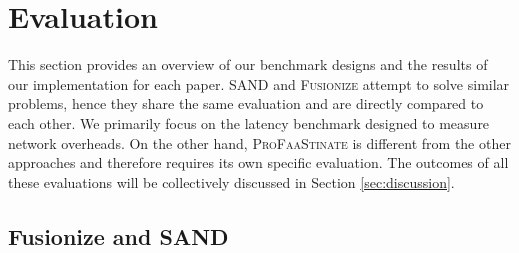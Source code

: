 \section{Evaluation}\label{sec:evaluation}


This section provides an overview of our benchmark designs and the results of
our implementation for each paper. SAND and \textsc{Fusionize} attempt to solve
similar problems, hence they share the same evaluation and are directly compared
to each other. We primarily focus on the latency benchmark designed to measure
network overheads. On the other hand, \textsc{ProFaaStinate} is different from
the other approaches and therefore requires its own specific evaluation. The
outcomes of all these evaluations will be collectively discussed in Section
\ref{sec:discussion}.

\subsection{Fusionize and SAND}





